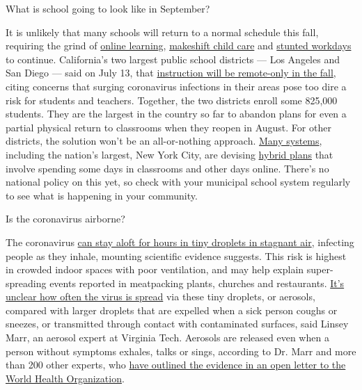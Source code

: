  What is school going to look like in September?

It is unlikely that many schools will return to a normal schedule this
fall, requiring the grind of
\href{https://www.nytimes.com/2020/06/05/us/coronavirus-education-lost-learning.html}{online
learning},
\href{https://www.nytimes.com/2020/05/29/us/coronavirus-child-care-centers.html}{makeshift
child care} and
\href{https://www.nytimes.com/2020/06/03/business/economy/coronavirus-working-women.html}{stunted
workdays} to continue. California's two largest public school districts
--- Los Angeles and San Diego --- said on July 13, that
\href{https://www.nytimes.com/2020/07/13/us/lausd-san-diego-school-reopening.html}{instruction
will be remote-only in the fall}, citing concerns that surging
coronavirus infections in their areas pose too dire a risk for students
and teachers. Together, the two districts enroll some 825,000 students.
They are the largest in the country so far to abandon plans for even a
partial physical return to classrooms when they reopen in August. For
other districts, the solution won't be an all-or-nothing approach.
\href{https://bioethics.jhu.edu/research-and-outreach/projects/eschool-initiative/school-policy-tracker/}{Many
systems}, including the nation's largest, New York City, are devising
\href{https://www.nytimes.com/2020/06/26/us/coronavirus-schools-reopen-fall.html}{hybrid
plans} that involve spending some days in classrooms and other days
online. There's no national policy on this yet, so check with your
municipal school system regularly to see what is happening in your
community.

 Is the coronavirus airborne?

The coronavirus
\href{https://www.nytimes.com/2020/07/04/health/239-experts-with-one-big-claim-the-coronavirus-is-airborne.html}{can
stay aloft for hours in tiny droplets in stagnant air}, infecting people
as they inhale, mounting scientific evidence suggests. This risk is
highest in crowded indoor spaces with poor ventilation, and may help
explain super-spreading events reported in meatpacking plants, churches
and restaurants.
\href{https://www.nytimes.com/2020/07/06/health/coronavirus-airborne-aerosols.html}{It's
unclear how often the virus is spread} via these tiny droplets, or
aerosols, compared with larger droplets that are expelled when a sick
person coughs or sneezes, or transmitted through contact with
contaminated surfaces, said Linsey Marr, an aerosol expert at Virginia
Tech. Aerosols are released even when a person without symptoms exhales,
talks or sings, according to Dr. Marr and more than 200 other experts,
who
\href{https://academic.oup.com/cid/article/doi/10.1093/cid/ciaa939/5867798}{have
outlined the evidence in an open letter to the World Health
Organization}.

